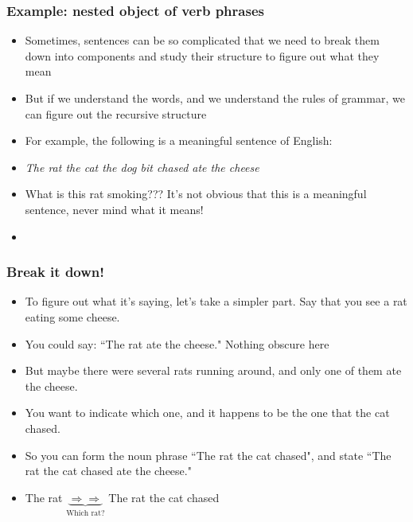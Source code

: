 \begin{frame}
\frametitle{Example: nested object of verb phrases}

\begin{itemize}[<+->]
\item Sometimes, sentences can be so complicated that we need to break them down into components and study their structure to figure out what they mean

\item But if we understand the words, and we understand the rules of grammar, we can figure out the recursive structure

\item For example, the following is a meaningful sentence of English:

\item \textit{The rat the cat the dog bit chased ate the cheese}

\item What is this rat smoking??? It's not obvious that this is a meaningful sentence, never mind what it means!

\item []\end{itemize} 
\end{frame}

 \begin{frame}
\frametitle{Break it down!}

\begin{itemize}[<+->]
\item 
To figure out what it's saying, let's take a simpler part. Say that you see a rat eating some cheese.

\item You could say: ``The rat ate the cheese." Nothing obscure here 

\item But maybe there were several rats running around, and only one of them ate the cheese.

\item  You want to indicate which one, and it happens to be the one that the cat chased.

\item So you can form the noun phrase ``The rat the cat chased", and state ``The rat the cat chased ate the cheese."

\item  The rat $\underbrace{\Longrightarrow\Longrightarrow}_{\text{Which rat?}}$ The rat the cat chased\\

\end{itemize} 
\end{frame}


